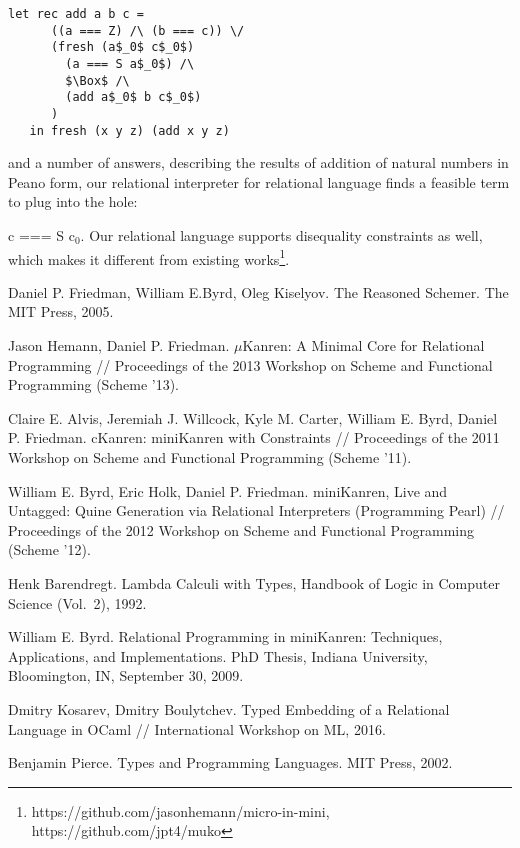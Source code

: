 \documentclass[10pt, oneside, nocopyrightspace]{sigplanconf}
\newcommand*{\SavedLstInline}{}
\DeclareRobustCommand*{\lstinline}{%
  \ifmmode
    \let\SavedBGroup\bgroup
    \def\bgroup{%
      \let\bgroup\SavedBGroup
      \hbox\bgroup
    }%
  \fi
  \SavedLstInline
}
\begin{document}
\begin{lstlisting}[basicstyle=\small]
   let rec add a b c =
      ((a === Z) /\ (b === c)) \/
      (fresh (a$_0$ c$_0$)
        (a === S a$_0$) /\
        $\Box$ /\
        (add a$_0$ b c$_0$)
      )
   in fresh (x y z) (add x y z)
  \end{lstlisting}

\noindent and a number of answers, describing the results of addition of natural numbers in Peano form, our relational interpreter for relational
language finds a feasible term to plug into the hole: \lstinline{c === S c$_0$}. Our relational language supports disequality
constraints as well, which makes it different from existing works\footnote{https://github.com/jasonhemann/micro-in-mini, https://github.com/jpt4/muko}.

\begin{thebibliography}{99}
Daniel P. Friedman, William E.Byrd, Oleg Kiselyov. The Reasoned Schemer. The MIT
Press, 2005.

Jason Hemann, Daniel P. Friedman. $\mu$Kanren: A Minimal Core for Relational Programming //
Proceedings of the 2013 Workshop on Scheme and Functional Programming (Scheme '13).

\bibitem{CKanren}
Claire E. Alvis, Jeremiah J. Willcock, Kyle M. Carter, William E. Byrd, Daniel P. Friedman.
cKanren: miniKanren with Constraints //
Proceedings of the 2011 Workshop on Scheme and Functional Programming (Scheme '11).

\bibitem{Untagged}
William E. Byrd, Eric Holk, Daniel P. Friedman.
miniKanren, Live and Untagged: Quine Generation via Relational Interpreters (Programming Pearl) //
Proceedings of the 2012 Workshop on Scheme and Functional Programming (Scheme '12).


\bibitem{Lambda}
Henk Barendregt. Lambda Calculi with Types, Handbook of Logic in Computer Science (Vol.~2), 1992.

\bibitem{WillThesis}
William E. Byrd. Relational Programming in miniKanren: Techniques, Applications, and Implementations. PhD Thesis,
Indiana University, Bloomington, IN, September 30, 2009.

Dmitry Kosarev, Dmitry Boulytchev. Typed Embedding of a Relational Language in OCaml // International Workshop on ML, 2016.

\bibitem{Types}
Benjamin Pierce. Types and Programming Languages. MIT Press, 2002.

\end{thebibliography}
\end{document}
